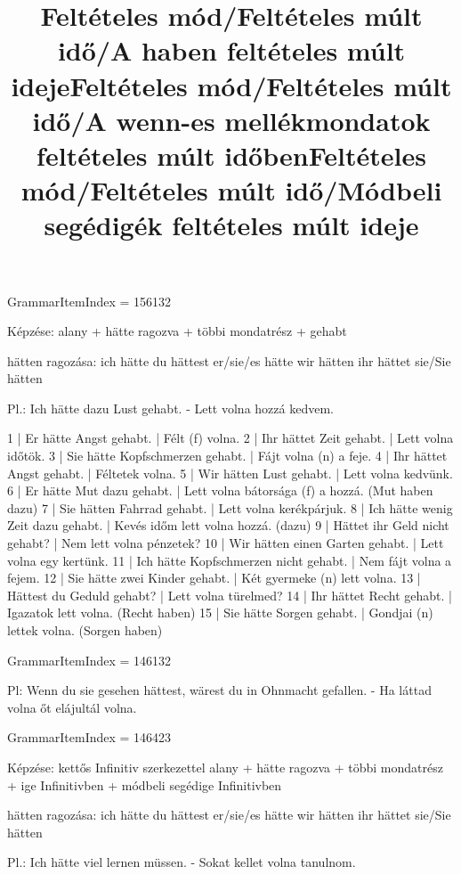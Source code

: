 \title{Feltételes mód/Feltételes múlt idő/A haben feltételes múlt ideje}

GrammarItemIndex = 156132

\begin{desc}
Képzése:
alany + hätte ragozva + többi mondatrész + gehabt

hätten ragozása:
ich hätte
du hättest
er/sie/es hätte
wir hätten
ihr hättet
sie/Sie hätten

Pl.: Ich hätte dazu Lust gehabt. - Lett volna hozzá kedvem.
\end{desc}

\begin{exmp}
1 | Er hätte Angst gehabt. | Félt (f) volna.
2 | Ihr hättet Zeit gehabt. | Lett volna időtök.
3 | Sie hätte Kopfschmerzen gehabt. | Fájt volna (n) a feje.
4 | Ihr hättet Angst gehabt. | Féltetek volna.
5 | Wir hätten Lust gehabt. | Lett volna kedvünk.
6 | Er hätte Mut dazu gehabt. | Lett volna bátorsága (f) a hozzá. (Mut haben dazu)
7 | Sie hätten Fahrrad gehabt. | Lett volna kerékpárjuk.
8 | Ich hätte wenig Zeit dazu gehabt. | Kevés időm lett volna hozzá. (dazu)
9 | Hättet ihr Geld nicht gehabt? | Nem lett volna pénzetek?
10 | Wir hätten einen Garten gehabt. | Lett volna egy kertünk.
11 | Ich hätte Kopfschmerzen nicht gehabt. | Nem fájt volna a fejem.
12 | Sie hätte zwei Kinder gehabt. | Két gyermeke (n) lett volna.
13 | Hättest du Geduld gehabt? | Lett volna türelmed?
14 | Ihr hättet Recht gehabt. | Igazatok lett volna. (Recht haben)
15 | Sie hätte Sorgen gehabt. | Gondjai (n) lettek volna. (Sorgen haben)
\end{exmp}

\title{Feltételes mód/Feltételes múlt idő/A wenn-es mellékmondatok feltételes múlt időben}

GrammarItemIndex = 146132

\begin{desc}
Pl: Wenn du sie gesehen hättest, wärest du in Ohnmacht gefallen. - Ha láttad volna őt elájultál volna.
\end{desc}

\begin{exmp}
\end{exmp}

\title{Feltételes mód/Feltételes múlt idő/Módbeli segédigék feltételes múlt ideje}

GrammarItemIndex = 146423

\begin{desc}
Képzése: kettős Infinitiv szerkezettel
alany + hätte ragozva + többi mondatrész + ige Infinitivben + módbeli segédige Infinitivben

hätten ragozása:
ich hätte
du hättest
er/sie/es hätte
wir hätten
ihr hättet
sie/Sie hätten

Pl.: Ich hätte viel lernen müssen. - Sokat kellet volna tanulnom.
\end{desc}

